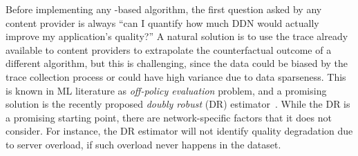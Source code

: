 Before implementing any \ddn-based algorithm, the first question asked by any content 
provider is always ``can I quantify how much DDN would actually improve
my application's quality?''
A natural solution is to use the trace already available to content providers to extrapolate
the counterfactual outcome of a different algorithm, but this is challenging, since the
data could be biased by the trace collection process or could have high variance due to 
data sparseness.
This is known in ML literature as {\em off-policy evaluation} problem, and a promising 
solution is the recently proposed {\em doubly robust} (DR) estimator~\cite{doublerobust}.
While the DR is a promising starting point, there are network-specific factors that it does 
not consider. For instance, the DR estimator will not identify quality degradation due to 
server overload, if such overload never happens in the dataset.

